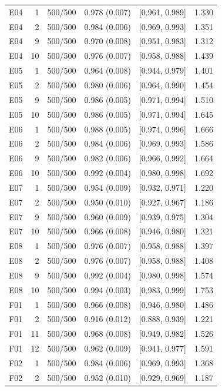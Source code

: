 \begin{longtable}[t]{lrllll}
E04 & 1 & 500/500 & 0.978 (0.007) & {}[0.961, 0.989] & 1.330\\
E04 & 2 & 500/500 & 0.984 (0.006) & {}[0.969, 0.993] & 1.351\\
E04 & 9 & 500/500 & 0.970 (0.008) & {}[0.951, 0.983] & 1.312\\
E04 & 10 & 500/500 & 0.976 (0.007) & {}[0.958, 0.988] & 1.439\\
E05 & 1 & 500/500 & 0.964 (0.008) & {}[0.944, 0.979] & 1.401\\
E05 & 2 & 500/500 & 0.980 (0.006) & {}[0.964, 0.990] & 1.454\\
E05 & 9 & 500/500 & 0.986 (0.005) & {}[0.971, 0.994] & 1.510\\
E05 & 10 & 500/500 & 0.986 (0.005) & {}[0.971, 0.994] & 1.645\\
E06 & 1 & 500/500 & 0.988 (0.005) & {}[0.974, 0.996] & 1.666\\
E06 & 2 & 500/500 & 0.984 (0.006) & {}[0.969, 0.993] & 1.586\\
E06 & 9 & 500/500 & 0.982 (0.006) & {}[0.966, 0.992] & 1.664\\
E06 & 10 & 500/500 & 0.992 (0.004) & {}[0.980, 0.998] & 1.692\\
E07 & 1 & 500/500 & 0.954 (0.009) & {}[0.932, 0.971] & 1.220\\
E07 & 2 & 500/500 & 0.950 (0.010) & {}[0.927, 0.967] & 1.186\\
E07 & 9 & 500/500 & 0.960 (0.009) & {}[0.939, 0.975] & 1.304\\
E07 & 10 & 500/500 & 0.966 (0.008) & {}[0.946, 0.980] & 1.321\\
E08 & 1 & 500/500 & 0.976 (0.007) & {}[0.958, 0.988] & 1.397\\
E08 & 2 & 500/500 & 0.976 (0.007) & {}[0.958, 0.988] & 1.408\\
E08 & 9 & 500/500 & 0.992 (0.004) & {}[0.980, 0.998] & 1.574\\
E08 & 10 & 500/500 & 0.994 (0.003) & {}[0.983, 0.999] & 1.753\\
F01 & 1 & 500/500 & 0.966 (0.008) & {}[0.946, 0.980] & 1.486\\
F01 & 2 & 500/500 & 0.916 (0.012) & {}[0.888, 0.939] & 1.221\\
F01 & 11 & 500/500 & 0.968 (0.008) & {}[0.949, 0.982] & 1.526\\
F01 & 12 & 500/500 & 0.962 (0.009) & {}[0.941, 0.977] & 1.591\\
F02 & 1 & 500/500 & 0.984 (0.006) & {}[0.969, 0.993] & 1.368\\
F02 & 2 & 500/500 & 0.952 (0.010) & {}[0.929, 0.969] & 1.187\\

\end{longtable}
